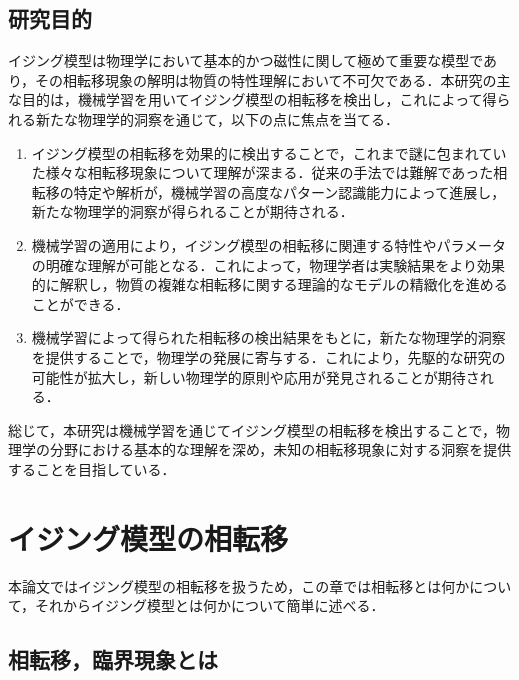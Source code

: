 \documentclass[a4paper,11pt]{jsreport}
\begin{document}
\section{研究目的}
イジング模型は物理学において基本的かつ磁性に関して極めて重要な模型であり，その相転移現象の解明は物質の特性理解において不可欠である．本研究の主な目的は，機械学習を用いてイジング模型の相転移を検出し，これによって得られる新たな物理学的洞察を通じて，以下の点に焦点を当てる．
\begin{enumerate}
  \item イジング模型の相転移を効果的に検出することで，これまで謎に包まれていた様々な相転移現象について理解が深まる．従来の手法では難解であった相転移の特定や解析が，機械学習の高度なパターン認識能力によって進展し，新たな物理学的洞察が得られることが期待される．
  \item 機械学習の適用により，イジング模型の相転移に関連する特性やパラメータの明確な理解が可能となる．これによって，物理学者は実験結果をより効果的に解釈し，物質の複雑な相転移に関する理論的なモデルの精緻化を進めることができる．
  \item 機械学習によって得られた相転移の検出結果をもとに，新たな物理学的洞察を提供することで，物理学の発展に寄与する．これにより，先駆的な研究の可能性が拡大し，新しい物理学的原則や応用が発見されることが期待される．
\end{enumerate}
総じて，本研究は機械学習を通じてイジング模型の相転移を検出することで，物理学の分野における基本的な理解を深め，未知の相転移現象に対する洞察を提供することを目指している．



\chapter{イジング模型の相転移}
本論文ではイジング模型の相転移を扱うため，この章では相転移とは何かについて，それからイジング模型とは何かについて簡単に述べる．\cite{高橋2017相転移}\cite{田崎統計力学2}
\section{相転移，臨界現象とは}
\end{document}
